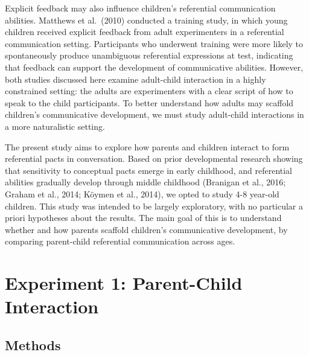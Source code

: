 \documentclass[10pt, letterpaper]{article}
\begin{document}
Explicit feedback may also influence children's referential
communication abilities. Matthews et al.~(2010) conducted a training
study, in which young children received explicit feedback from adult
experimenters in a referential communication setting. Participants who
underwent training were more likely to spontaneously produce unambiguous
referential expressions at test, indicating that feedback can support
the development of communicative abilities. However, both studies
discussed here examine adult-child interaction in a highly constrained
setting: the adults are experimenters with a clear script of how to
speak to the child participants. To better understand how adults may
scaffold children's communicative development, we must study adult-child
interactions in a more naturalistic setting.

The present study aims to explore how parents and children interact to
form referential pacts in conversation. Based on prior developmental
research showing that sensitivity to conceptual pacts emerge in early
childhood, and referential abilities gradually develop through middle
childhood (Branigan et al., 2016; Graham et al., 2014; Köymen et al.,
2014), we opted to study 4-8 year-old children. This study was intended
to be largely exploratory, with no particular a priori hypotheses about
the results. The main goal of this is to understand whether and how
parents scaffold children's communicative development, by comparing
parent-child referential communication across ages.

\hypertarget{experiment-1-parent-child-interaction}{%
\section{Experiment 1: Parent-Child
Interaction}\label{experiment-1-parent-child-interaction}}

\hypertarget{methods}{%
\subsection{Methods}\label{methods}}
\end{document}
